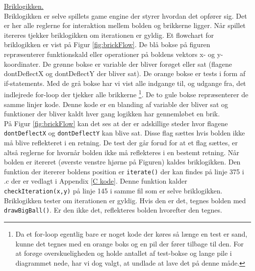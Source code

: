 \underline{Briklogikken.}\\

Briklogikken er selve spillets game engine der styrer hvordan det opfører sig. Det er her alle reglerne for interaktion mellem bolden og brikkerne ligger. Når spillet itereres tjekker briklogikken om iterationen er gyldig. Et flowchart for briklogikken er vist på Figur \ref{fig:brickFlow}. De blå bokse på figuren repræsenterer funktionskald eller operationer på boldens vektors x- og y-koordinater. De grønne bokse er variable der bliver forøget eller sat (flagene dontDeflectX og dontDeflectY der bliver sat). De orange bokse er tests i form af if-statements. Med de grå bokse har vi vist alle indgange til, og udgange fra, det indlejrede for-loop der tjekker alle brikkerne
\footnote{Da et for-loop egentlig bare er noget kode der køres så længe en test er sand, kunne det tegnes med en orange boks og en pil der fører tilbage til den. For at forøge overskueligheden og holde antallet af test-bokse og lange pile i diagrammet nede, har vi dog valgt, at undlade at lave det på denne måde.}. De to gule bokse repræsenterer de samme linjer kode. Denne kode er en blanding af variable der bliver sat og funktioner der bliver kaldt hver gang logikken har gennemløbet en brik. \\

På Figur \ref{fig:brickFlow} kan det ses at der er adskillige steder hvor flagene \texttt{dontDeflectX} og \texttt{dontDeflectY} kan blive sat. Disse flag sættes hvis bolden ikke må blive reflekteret i en retning. De test der går forud for at et flag sættes, er altså reglerne for hvornår bolden ikke må reflekteres i en bestemt retning. 
Når bolden er itereret (øverste venstre hjørne på Figuren) kaldes briklogikken. Den funktion der itererer boldens position er \texttt{iterate()} der kan findes på linje 375 i .c der er vedlagt i Appendix \ref{C kode}. Denne funktion kalder \texttt{checkIteration(x,y)} på linje 145 i samme fil som er selve briklogikken. Briklogikken tester om iterationen er gyldig. Hvis den er det, tegnes bolden med \texttt{drawBigBall()}. Er den ikke det, reflekteres bolden hvorefter den tegnes. 


